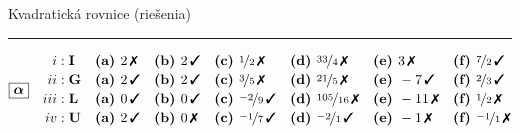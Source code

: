 \documentclass[10pt]{report}
\begin{document}
\clearpage
\begin{landscape}
\begin{center}
{\huge Kvadratická rovnice (riešenia)}\\[4mm]
\begin{varwidth}{\linewidth}
\small
\rule[1mm]{\linewidth}{0.5pt}
$\boxed{\bm{\alpha}} \quad \begin{aligned}
\romannumeral1 : \; &\textbf{I} 
 &&\mathrm{\textbf{(a) }} 2\,\text{\ding{55}}
 &&\mathrm{\textbf{(b) }} 2\,\text{\ding{51}}
 &&\mathrm{\textbf{(c) }} \nicefrac{1}{2}\,\text{\ding{55}}
 &&\mathrm{\textbf{(d) }} \nicefrac{33}{4}\,\text{\ding{55}}
 &&\mathrm{\textbf{(e) }} 3\,\text{\ding{55}}
 &&\mathrm{\textbf{(f) }} \nicefrac{7}{2}\,\text{\ding{51}}
\\[-0.4mm]
\romannumeral2 : \; &\textbf{G} 
 &&\mathrm{\textbf{(a) }} 2\,\text{\ding{51}}
 &&\mathrm{\textbf{(b) }} 2\,\text{\ding{51}}
 &&\mathrm{\textbf{(c) }} \nicefrac{3}{5}\,\text{\ding{55}}
 &&\mathrm{\textbf{(d) }} \nicefrac{21}{5}\,\text{\ding{55}}
 &&\mathrm{\textbf{(e) }} -7\,\text{\ding{51}}
 &&\mathrm{\textbf{(f) }} \nicefrac{2}{3}\,\text{\ding{51}}
\\[-0.4mm]
\romannumeral3 : \; &\textbf{L} 
 &&\mathrm{\textbf{(a) }} 0\,\text{\ding{51}}
 &&\mathrm{\textbf{(b) }} 0\,\text{\ding{51}}
 &&\mathrm{\textbf{(c) }} \nicefrac{-2}{9}\,\text{\ding{51}}
 &&\mathrm{\textbf{(d) }} \nicefrac{105}{16}\,\text{\ding{55}}
 &&\mathrm{\textbf{(e) }} -11\,\text{\ding{55}}
 &&\mathrm{\textbf{(f) }} \nicefrac{1}{2}\,\text{\ding{55}}
\\[-0.4mm]
\romannumeral4 : \; &\textbf{U} 
 &&\mathrm{\textbf{(a) }} 2\,\text{\ding{51}}
 &&\mathrm{\textbf{(b) }} 0\,\text{\ding{55}}
 &&\mathrm{\textbf{(c) }} \nicefrac{-1}{7}\,\text{\ding{51}}
 &&\mathrm{\textbf{(d) }} \nicefrac{-2}{1}\,\text{\ding{51}}
 &&\mathrm{\textbf{(e) }} -1\,\text{\ding{55}}
 &&\mathrm{\textbf{(f) }} \nicefrac{-1}{1}\,\text{\ding{55}}
\end{aligned} $
\\[2mm]

\end{varwidth}
\end{center}
\end{landscape}
\end{document}
